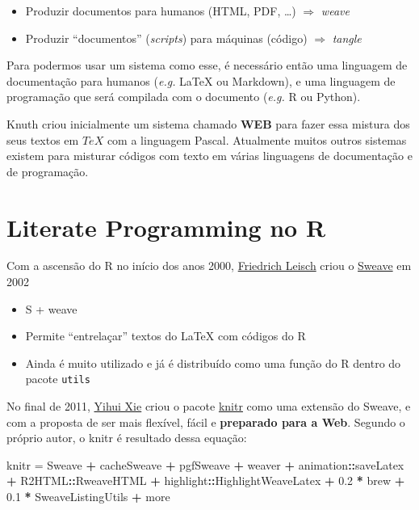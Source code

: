 \documentclass[10pt,a4paper]{book}
\newenvironment{Shaded}{\begin{snugshade}}{\end{snugshade}}
\newcommand{\FloatTok}[1]{\textcolor[rgb]{0.00,0.00,0.81}{#1}}
\newcommand{\StringTok}[1]{\textcolor[rgb]{0.31,0.60,0.02}{#1}}
\newcommand{\OperatorTok}[1]{\textcolor[rgb]{0.81,0.36,0.00}{\textbf{#1}}}
\newcommand{\NormalTok}[1]{#1}
\providecommand{\tightlist}{%
  \setlength{\itemsep}{0pt}\setlength{\parskip}{0pt}}
\begin{document}
\begin{itemize}
\tightlist
\item
  Produzir documentos para humanos (HTML, PDF, \ldots{}) \(\Rightarrow\)
  \emph{weave}
\item
  Produzir ``documentos'' (\emph{scripts}) para máquinas (código)
  \(\Rightarrow\) \emph{tangle}
\end{itemize}

Para podermos usar um sistema como esse, é necessário então uma
linguagem de documentação para humanos (\emph{e.g.} LaTeX ou Markdown),
e uma linguagem de programação que será compilada com o documento
(\emph{e.g.} R ou Python).

Knuth criou inicialmente um sistema chamado \textbf{WEB} para fazer essa
mistura dos seus textos em \(TeX\) com a linguagem Pascal. Atualmente
muitos outros sistemas existem para misturar códigos com texto em várias
linguagens de documentação e de programação.

\section{Literate Programming no R}\label{literate-programming-no-r}

Com a ascensão do R no início dos anos 2000,
\href{http://www.statistik.lmu.de/~leisch}{Friedrich Leisch} criou o
\href{https://www.statistik.lmu.de/~leisch/Sweave}{Sweave} em 2002

\begin{itemize}
\tightlist
\item
  S + weave
\item
  Permite ``entrelaçar'' textos do LaTeX com códigos do R
\item
  Ainda é muito utilizado e já é distribuído como uma função do R dentro
  do pacote \texttt{utils}
\end{itemize}

No final de 2011, \href{http://yihui.name/}{Yihui Xie} criou o pacote
\href{http://yihui.name/knitr}{knitr} como uma extensão do Sweave, e com
a proposta de ser mais flexível, fácil e \textbf{preparado para a Web}.
Segundo o próprio autor, o knitr é resultado dessa equação:

\begin{Shaded}
\begin{Highlighting}[]
\NormalTok{knitr =}\StringTok{ }\NormalTok{Sweave }\OperatorTok{+}\StringTok{ }\NormalTok{cacheSweave }\OperatorTok{+}\StringTok{ }\NormalTok{pgfSweave }\OperatorTok{+}\StringTok{ }\NormalTok{weaver }\OperatorTok{+}
\StringTok{    }\NormalTok{animation}\OperatorTok{::}\NormalTok{saveLatex }\OperatorTok{+}\StringTok{ }\NormalTok{R2HTML}\OperatorTok{::}\NormalTok{RweaveHTML }\OperatorTok{+}
\StringTok{    }\NormalTok{highlight}\OperatorTok{::}\NormalTok{HighlightWeaveLatex }\OperatorTok{+}\StringTok{ }\FloatTok{0.2} \OperatorTok{*}\StringTok{ }\NormalTok{brew }\OperatorTok{+}
\StringTok{    }\FloatTok{0.1} \OperatorTok{*}\StringTok{ }\NormalTok{SweaveListingUtils }\OperatorTok{+}\StringTok{ }\NormalTok{more}
\end{Highlighting}
\end{Shaded}
\end{document}
